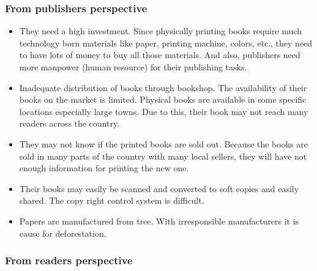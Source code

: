 		\subsubsection{From publishers perspective}

\begin{itemize}
	\item They need a high investment. Since physically printing books require much technology born materials like paper, printing machine, colors, etc., they need to have lots of money to buy all those materials. And also, publishers need more manpower (human resource) for their publishing tasks.
	\item Inadequate distribution of books through bookshop. The availability of their books on the market is limited. Physical books are available in some specific locations especially large towns. Due to this, their book may not reach many readers across the country.
	\item They may not know if the printed books are sold out. Because the books are sold in many parts of the country with many local sellers, they will have not enough information for printing the new one.
	\item Their books may easily be scanned and converted to soft copies and easily shared. The copy right control system is difficult.
	\item Papers are manufactured from tree. With irresponsible manufacturers it is cause for deforestation.
\end{itemize}

		\subsubsection{From readers perspective}

